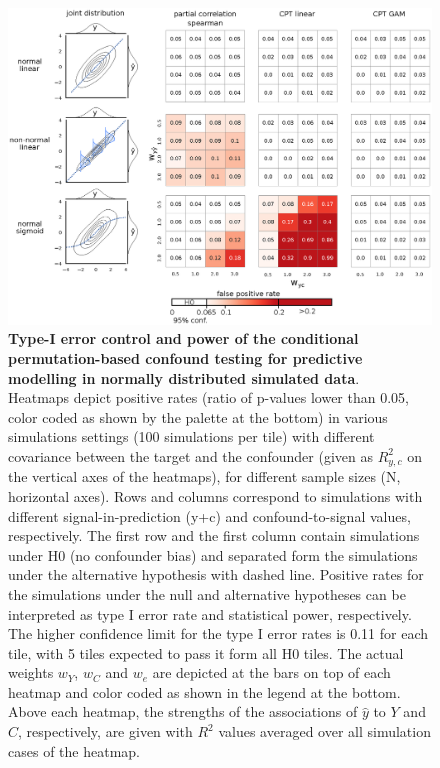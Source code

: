\documentclass{article}
\begin{document}
\begin{figure}[!b]
  \centering
  \includegraphics[width=0.75\paperwidth]{fig/sim_h0_demo.eps}
  \caption{\textbf{Type-I error control and power of the conditional permutation-based confound testing for predictive modelling in normally distributed simulated data}. \\
  Heatmaps depict positive rates (ratio of p-values lower than 0.05, color coded as shown by the palette at the bottom) in various simulations settings (100 simulations per tile) with different covariance between the target and the confounder (given as $R^2_{y,c}$ on the vertical axes of the heatmaps), for different sample sizes (N, horizontal axes).
  Rows and columns correspond to simulations with different signal-in-prediction (y+c) and confound-to-signal values, respectively. The first row and the first column contain simulations under H0 (no confounder bias) and separated form the simulations under the alternative hypothesis with dashed line. Positive rates for the simulations under the null and alternative hypotheses can be interpreted as type I error rate and statistical power, respectively. The higher confidence limit for the type I error rates is 0.11 for each tile, with 5 tiles expected to pass it form all H0 tiles.
  The actual weights $w_{Y}$, $w_{C}$ and $w_{e}$ are depicted at the bars on top of each heatmap and color coded as shown in the legend at the bottom. Above each heatmap, the strengths of the associations of $\hat{y}$ to $Y$ and $C$, respectively, are given with $R^2$ values averaged over all simulation cases of the heatmap.
  }
  \label{fig:sim-normal}
\end{figure}
\end{document}
